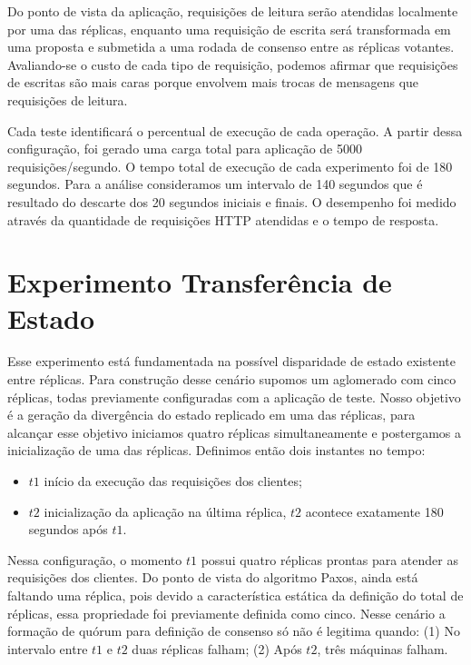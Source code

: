 Do ponto de vista da aplicação, requisições de leitura serão atendidas localmente por uma
das réplicas, enquanto uma requisição de escrita será transformada em uma proposta e
submetida a uma rodada de consenso entre as réplicas votantes. Avaliando-se o custo de
cada tipo de requisição, podemos afirmar que requisições de escritas são mais caras porque
envolvem mais trocas de mensagens que requisições de leitura.

Cada teste identificará o percentual de execução de cada operação. A partir dessa
configuração, foi gerado uma carga total para aplicação de 5000 requisições/segundo. O
tempo total de execução de cada experimento foi de 180 segundos. Para a análise
consideramos um intervalo de 140 segundos que é resultado do descarte dos 20 segundos
iniciais e finais. O desempenho foi medido através da quantidade de requisições HTTP
atendidas e o tempo de resposta.


\section{Experimento Transferência de Estado}\label{sec:experimento_tranferencia_estado}

Esse experimento está fundamentada na possível disparidade de estado existente entre
réplicas. Para construção desse cenário supomos um aglomerado com cinco réplicas, todas
previamente configuradas com a aplicação de teste. Nosso objetivo é a geração da
divergência do estado replicado em uma das réplicas, para alcançar esse objetivo iniciamos
quatro réplicas simultaneamente e postergamos a inicialização de uma das réplicas.
Definimos então dois instantes no tempo:

\begin{itemize}
  \item $t1$ início da execução das requisições dos clientes;
  \item $t2$ inicialização da aplicação na última réplica, $t2$ acontece exatamente 180
    segundos após $t1$.
\end{itemize}

Nessa configuração, o momento $t1$ possui quatro réplicas prontas para atender as
requisições dos clientes. Do ponto de vista do algoritmo Paxos, ainda está faltando uma
réplica, pois devido a característica estática da definição do total de réplicas, essa
propriedade foi previamente definida como cinco. Nesse cenário a formação de quórum para
definição de consenso só não é legitima quando: (1) No intervalo entre $t1$ e $t2$ duas
réplicas falham; (2) Após $t2$, três máquinas falham.

